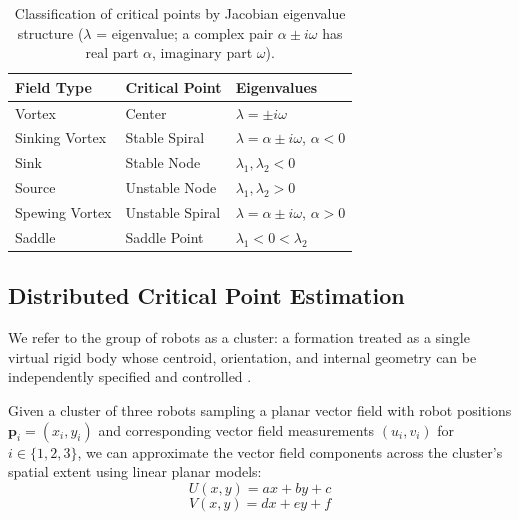 \documentclass[lettersize,journal]{IEEEtran}
\begin{document}
\begin{table}[!t]
    \centering
    \caption{Classification of critical points by Jacobian eigenvalue structure ($\lambda$ = eigenvalue; a complex pair $\alpha \pm i\omega$ has real part $\alpha$, imaginary part $\omega$).}
    \label{tab:field_summary}
    \begin{tabular}{lll}
    \hline
    \textbf{Field Type} & \textbf{Critical Point} & \textbf{Eigenvalues} \\
    \hline
    Vortex & Center & $\lambda = \pm i\omega$ \\
    Sinking Vortex & Stable Spiral & $\lambda = \alpha \pm i\omega$, $\alpha < 0$ \\
    Sink & Stable Node & $\lambda_1, \lambda_2 < 0$ \\
    Source & Unstable Node & $\lambda_1, \lambda_2 > 0$ \\
    Spewing Vortex & Unstable Spiral & $\lambda = \alpha \pm i\omega$, $\alpha > 0$ \\
    Saddle & Saddle Point & $\lambda_1 < 0 < \lambda_2$ \\
    \hline
    \end{tabular}
\end{table}


\subsection{Distributed Critical Point Estimation}
\noindent

We refer to the group of robots as a cluster: a formation treated as a single virtual rigid body whose centroid, orientation, and internal geometry can be independently specified and controlled \cite{50,51}.

Given a cluster of three robots sampling a planar vector field with robot positions $\mathbf{p}_i = (x_i, y_i)$ and corresponding vector field measurements $(u_i, v_i)$ for $i \in \{1, 2, 3\}$, we can approximate the vector field components across the cluster's spatial extent using linear planar models:
\begin{equation}\label{eq:2}
U(x,y) = ax + by + c
\end{equation}
\begin{equation}\label{eq:3}
V(x,y) = dx + ey + f
\end{equation}
\end{document}
